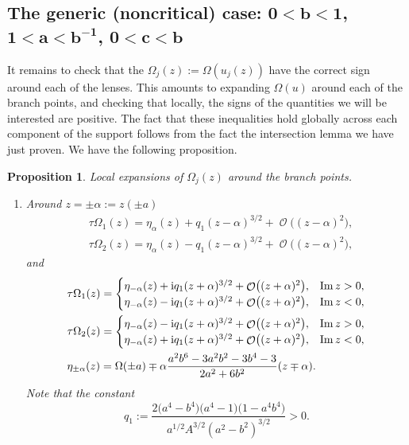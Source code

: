 \documentclass[10pt,a4paper]{amsart}
\DeclareMathOperator{\OO}{\mathcal{O}}
\numberwithin{equation}{section}
\newtheorem{Proposition}[Theorem]{Proposition}
 { \theoremstyle{definition}
\newtheorem{Definition}[Theorem]{Definition}
\newtheorem{Note}[Theorem]{Note}
\newtheorem{Example}[Theorem]{Example}
\newtheorem{Remark}[Theorem]{Remark} }
\begin{document}
\subsection[The generic (noncritical) case: $0< b < 1$, $1 < a < b^{-1}$, $0 < c < b$]{The generic (noncritical) case: $\boldsymbol{0< b < 1}$, $\boldsymbol{1 < a < b^{-1}}$, $\boldsymbol{0 < c < b}$}
It remains to check that the $\Omega_j(z):=\Omega(u_j(z))$ have the correct sign around each of the lenses. This amounts to expanding $\Omega(u)$ around each of the
branch points, and checking that locally, the signs of the quantities we will be interested are positive. The fact that these inequalities hold
globally across each component of the support follows from the fact the intersection lemma we have just proven. We have the following proposition.

\begin{Proposition} \label{local-expansions-generic}
 Local expansions of $\Omega_j(z)$ around the branch points.
 \begin{enumerate}\itemsep=0pt
 \item[$(1)$] Around $z = \pm\alpha := z(\pm a)$
 \begin{align*}
 &\tau\Omega_1(z)= \eta_\alpha(z) + q_1 (z-\alpha)^{3/2} +\OO\bigl( (z-\alpha)^{2} \bigr),\\
 &\tau\Omega_2(z)= \eta_\alpha(z) - q_1 (z-\alpha)^{3/2} +\OO\bigl( (z-\alpha)^{2} \bigr),
 \end{align*}
 and
 \begin{align*}
 &\tau\Omega_1(z)= \begin{cases}
 \eta_{-\alpha}(z) + {\rm i}q_1 (z+\alpha)^{3/2} +\OO\bigl( (z+\alpha)^{2} \bigr), & \operatorname{Im} z >0,\\
 \eta_{-\alpha}(z) - {\rm i}q_1 (z+\alpha)^{3/2} +\OO\bigl( (z+\alpha)^{2} \bigr), & \operatorname{Im} z <0,
 \end{cases} \\
 &\tau\Omega_2(z)=
 \begin{cases}
 \eta_{-\alpha}(z) - {\rm i}q_1 (z+\alpha)^{3/2} +\OO\bigl( (z+\alpha)^{2} \bigr), & \operatorname{Im} z >0,\\
 \eta_{-\alpha}(z) + {\rm i}q_1 (z+\alpha)^{3/2} +\OO\bigl( (z+\alpha)^{2} \bigr), & \operatorname{Im} z <0,
 \end{cases}\\
 & \eta_{\pm \alpha} (z) = \Omega(\pm a) \mp \alpha\frac{a^2b^6 - 3a^2b^2 - 3b^4 - 3}{2a^2 + 6b^2}(z\mp \alpha).
 \end{align*}
Note that the constant
 \[
 q_1:=\frac{2\bigl(a^4-b^4\bigr)\bigl(a^4-1\bigr)\bigl(1-a^4b^4\bigr)}{a^{1/2}A^{3/2} (a^2-b^2)^{3/2}} >0.
 \]


\end{enumerate}
\end{Proposition}
\end{document}
